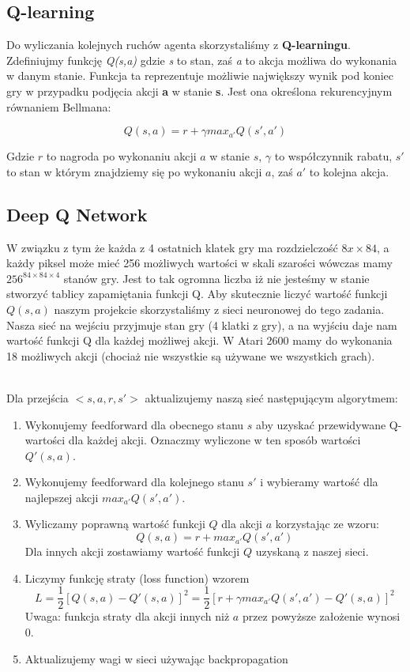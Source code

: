 \documentclass[12pt]{article}
\begin{document}
\subsection{Q-learning}

Do wyliczania kolejnych ruchów agenta skorzystaliśmy z \textbf{Q-learningu}. Zdefiniujmy funkcję \textit{Q(s,a)} gdzie \textit{s} to stan, zaś \textit{a} to akcja możliwa do wykonania w danym stanie. Funkcja ta reprezentuje możliwie największy wynik pod koniec gry w przypadku podjęcia akcji \textbf{a} w stanie \textbf{s}. Jest ona określona rekurencyjnym równaniem Bellmana:

$$Q(s,a) =  r + \gamma max_{a'}Q(s',a')$$

Gdzie $r$ to nagroda po wykonaniu akcji $a$ w stanie $s$, $\gamma$ to współczynnik rabatu, $s'$ to stan w którym znajdziemy się po wykonaniu akcji $a$, zaś $a'$ to kolejna akcja.

\subsection{Deep Q Network}

W związku z tym że każda z 4 ostatnich klatek gry ma rozdzielczość $8x\times 84$, a każdy piksel może mieć 256 możliwych wartości w skali szarości wówczas mamy $256^{84\times84\times4}$ stanów gry. Jest to tak ogromna liczba iż nie jesteśmy w stanie stworzyć tablicy zapamiętania funkcji Q.
Aby skutecznie liczyć wartość funkcji $Q(s,a)$ naszym projekcie skorzystaliśmy z sieci neuronowej do tego zadania. Nasza sieć na wejściu przyjmuje stan gry (4 klatki z gry), a na wyjściu daje nam wartość funkcji Q dla każdej możliwej akcji. W Atari 2600 mamy do wykonania 18 możliwych akcji (chociaż nie wszystkie są używane we wszystkich grach).
\\\

Dla przejścia $<s, a, r, s'>$ aktualizujemy naszą sieć następującym algorytmem:
\begin{enumerate}
\item Wykonujemy feedforward dla obecnego stanu $s$ aby uzyskać przewidywane Q-wartości dla każdej akcji. Oznaczmy wyliczone w ten sposób wartości $Q'(s,a)$.
\item Wykonujemy feedforward dla kolejnego stanu $s'$ i wybieramy wartość dla najlepszej akcji $max_{a'}Q(s',a')$.
\item Wyliczamy poprawną wartość funkcji $Q$ dla akcji $a$ korzystając ze wzoru: $$Q(s, a) = r + max_{a'}Q(s',a')$$ Dla innych akcji zostawiamy wartość funkcji $Q$ uzyskaną z naszej sieci.
\item Liczymy funkcję straty (loss function) wzorem $$L=\frac{1}{2}[Q(s,a)-Q'(s,a)]^2=\frac{1}{2}[r+\gamma max_{a'}Q(s',a')-Q'(s,a)]^2$$ Uwaga: funkcja straty dla akcji innych niż $a$ przez powyższe założenie wynosi 0. 
\item Aktualizujemy wagi w sieci używając backpropagation
\end{enumerate}
\end{document}
